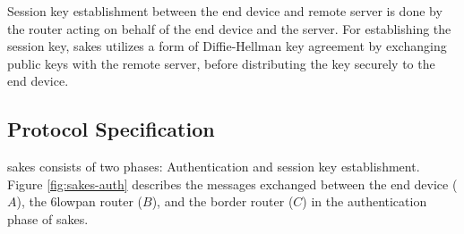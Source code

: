 Session key establishment between the end device and remote server is done by the router acting on behalf of the end device and the server. For establishing the session key, \gls{sakes} utilizes a form of Diffie-Hellman key agreement by exchanging public keys with the remote server, before distributing the key securely to the end device.




\subsection{Protocol Specification}
\label{subsec:sakes-spec}

\gls{sakes} consists of two phases: Authentication and session key establishment. Figure \ref{fig:sakes-auth} describes the messages exchanged between the end device ($A$), the \gls{6lowpan} router ($B$), and the border router ($C$) in the authentication phase of \gls{sakes}.


